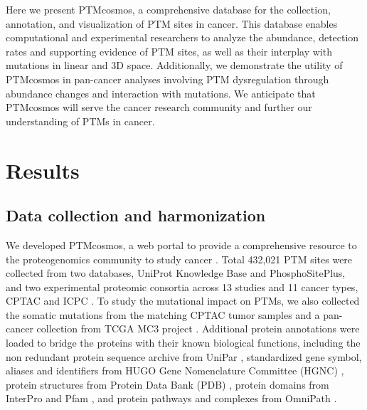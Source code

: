 Here we present PTMcosmos, a comprehensive database for the collection, annotation, and visualization of PTM sites in cancer. This database enables computational and experimental researchers to analyze the abundance, detection rates and supporting evidence of PTM sites, as well as their interplay with mutations in linear and 3D space. Additionally, we demonstrate the utility of PTMcosmos in pan-cancer analyses involving PTM dysregulation through abundance changes and interaction with mutations. We anticipate that PTMcosmos will serve the cancer research community and further our understanding of PTMs in cancer.



\section{Results}

\subsection{Data collection and harmonization}
We developed PTMcosmos, a web portal to provide a comprehensive resource to the proteogenomics community to study cancer . Total 432,021 PTM sites were collected from two databases, UniProt Knowledge Base and PhosphoSitePlus, and two experimental proteomic consortia across 13 studies and 11 cancer types, CPTAC and ICPC . To study the mutational impact on PTMs, we also collected the somatic mutations from the matching CPTAC tumor samples and a pan-cancer collection from TCGA MC3 project \cite{ellrottk_tcga:MC3MutationCalling2018}. Additional protein annotations were loaded to bridge the proteins with their known biological functions, including the non redundant protein sequence archive from UniPar \cite{leinonenr_apweilerr:UniProtArchive2004}, standardized gene symbol, aliases and identifiers from HUGO Gene Nomenclature Committee (HGNC) \cite{brufordea_tweedies:GuidelinesHuman2020}, protein structures from Protein Data Bank (PDB) \cite{bermanhm_bournepe:ProteinData2000}, protein domains from InterPro \cite{blumm_finnrd:InterProProtein2021} and Pfam \cite{mistryj_batemana:PfamProtein2021}, and protein pathways and complexes from OmniPath \cite{tureid_saez-rodriguezj:OmniPathGuidelines2016}.

